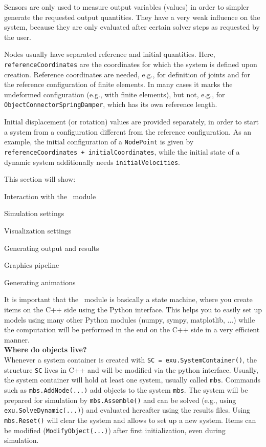 Sensors are only used to measure output variables (values) in order to simpler generate the requested output quantities.
They have a very weak influence on the system, because they are only evaluated after certain solver steps as requested by the user.

Nodes usually have separated reference and initial quantities. Here, 
\texttt{referenceCoordinates} are the coordinates for which the system is defined upon creation. Reference coordinates are needed, e.g., for definition of joints and for the reference configuration of finite elements. In many cases it marks the undeformed configuration (e.g., with finite elements), but not, e.g., for \texttt{ObjectConnectorSpringDamper}, which has its own reference length. 

Initial displacement (or rotation) values are provided separately, in order to start a system from a configuration different from the reference configuration.
As an example, the initial configuration of a \texttt{NodePoint} is given by \texttt{referenceCoordinates + initialCoordinates}, while the initial state of a dynamic system additionally needs \texttt{initialVelocities}.


 \label{sec:exudynBasics}
This section will show:
\bi
	\item Interaction with the \codeName\ module
	\item Simulation settings
	\item Visualization settings
	\item Generating output and results
	\item Graphics pipeline
	\item Generating animations
\ei


It is important that the \codeName\ module is basically a state machine, where you create items on the C++ side using the Python interface. This helps you to easily set up models using many other Python modules (numpy, sympy, matplotlib, ...) while the computation will be performed in the end on the C++ side in a very efficient manner. 
\vspace{12pt}\\
{\bf Where do objects live?}\vspace{6pt}\\
Whenever a system container is created with \texttt{SC = exu.SystemContainer()}, the structure \texttt{SC} lives in C++ and will be modified via the python interface.
Usually, the system container will hold at least one system, usually called \texttt{mbs}.
Commands such as \texttt{mbs.AddNode(...)} add objects to the system \texttt{mbs}. 
The system will be prepared for simulation by \texttt{mbs.Assemble()} and can be solved (e.g., using \texttt{exu.SolveDynamic(...)}) and evaluated hereafter using the results files.
Using \texttt{mbs.Reset()} will clear the system and allows to set up a new system. Items can be modified (\texttt{ModifyObject(...)}) after first initialization, even during simulation.
%

